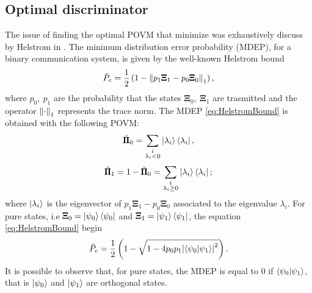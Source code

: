     \subsection{Optimal discriminator}
    The issue of finding the optimal POVM that minimize was exhaustively discuss  by Helstrom in 
    \cite{helstrom3,helstrom4}. The minimum distribution error probability (MDEP), for a binary 
    communication system, is given by the well-known Helstrom bound
    \begin{equation}
        \breve{P}_e = \frac{1}{2} \left(1-\norm{p_1 \pmb{\Xi}_1 - p_0 \pmb{\Xi}_0}_1 \right),
        \label{eq:HelstromBound}
    \end{equation}
    where $p_0,\ p_1$ are the probability that the states $\pmb{\Xi}_0,\ \pmb{\Xi}_1$ are trasmitted
    and the operator $\norm{\cdot}_1$ represents the trace norm. 
    The MDEP \ref{eq:HelstromBound} is obtained with the following POVM:
    \begin{equation}
        \breve{\pmb{\Pi}}_0 = \sum_{\substack{i \\ \lambda_i<0}} \ket{\lambda_i}\bra{\lambda_i},
    \end{equation}
    \begin{equation*}
        \breve{\pmb{\Pi}}_1 = 1-\breve{\pmb{\Pi}}_0 = 
        \sum_{\substack{i \\ \lambda_i \geq 0}} \ket{\lambda_i}\bra{\lambda_i};
    \end{equation*}
    where $\ket{\lambda_i}$ is the eigenvector of $p_1 \pmb{\Xi}_1 - p_0 \pmb{\Xi}_0$ associated to 
    the eigenvalue $\lambda_i$.
    For pure states, i.e $\pmb{\Xi}_0 = \ket{\psi_0}\bra{\psi_0}$ and $\pmb{\Xi}_1 = \ket{\psi_1}
    \bra{\psi_1}$, the equation \ref{eq:HelstromBound} begin
    \begin{equation}
        \breve{P}_e = \frac{1}{2} \left(1- \sqrt{1-4 p_0 p_1 \absolutevalue{\braket{\psi_0}{\psi_1}}^2}
        \right).
        \label{eq:HelstromBPure}
    \end{equation}
    It is possible to observe that, for pure states, the MDEP is equal to $0$ if $\braket{\psi_0}{\psi_1}$,
    that is $\ket{\psi_0}$ and $\ket{\psi_1}$ are orthogonal states.